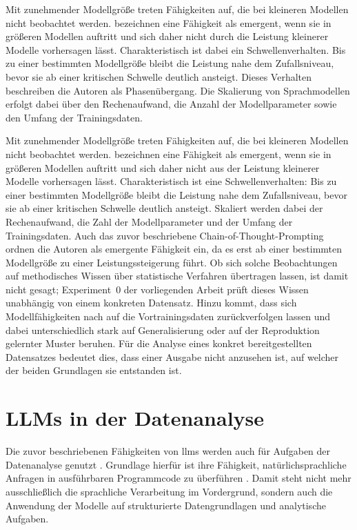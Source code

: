 Mit zunehmender Modellgröße treten Fähigkeiten auf, die bei kleineren Modellen nicht beobachtet werden. \textcite{wei_emergent_2022} bezeichnen eine Fähigkeit als emergent, wenn sie in größeren Modellen auftritt und sich daher nicht durch die Leistung kleinerer Modelle vorhersagen lässt. Charakteristisch ist dabei ein Schwellenverhalten. Bis zu einer bestimmten Modellgröße bleibt die Leistung nahe dem Zufallsniveau, bevor sie ab einer kritischen Schwelle deutlich ansteigt. Dieses Verhalten beschreiben die Autoren als Phasenübergang. Die Skalierung von Sprachmodellen erfolgt dabei über den Rechenaufwand, die Anzahl der Modellparameter sowie den Umfang der Trainingsdaten.

Mit zunehmender Modellgröße treten Fähigkeiten auf, die bei kleineren Modellen nicht beobachtet werden. \textcite{wei_emergent_2022} bezeichnen eine Fähigkeit als emergent, wenn sie in größeren Modellen auftritt und sich daher nicht aus der Leistung kleinerer Modelle vorhersagen lässt. Charakteristisch ist eine Schwellenverhalten: Bis zu einer bestimmten Modellgröße bleibt die Leistung nahe dem Zufallsniveau, bevor sie ab einer kritischen Schwelle deutlich ansteigt. Skaliert werden dabei der Rechenaufwand, die Zahl der Modellparameter und der Umfang der Trainingsdaten. Auch das zuvor beschriebene Chain-of-Thought-Prompting ordnen die Autoren als emergente Fähigkeit ein, da es erst ab einer bestimmten Modellgröße zu einer Leistungssteigerung führt. Ob sich solche Beobachtungen auf methodisches Wissen über statistische Verfahren übertragen lassen, ist damit nicht gesagt; Experiment~0 der vorliegenden Arbeit prüft dieses Wissen unabhängig von einem konkreten Datensatz. Hinzu kommt, dass sich Modellfähigkeiten nach \textcite{wang_generalization_2024} auf die Vortrainingsdaten zurückverfolgen lassen und dabei unterschiedlich stark auf Generalisierung oder auf der Reproduktion gelernter Muster beruhen. Für die Analyse eines konkret bereitgestellten Datensatzes bedeutet dies, dass einer Ausgabe nicht anzusehen ist, auf welcher der beiden Grundlagen sie entstanden ist.
 
\section{LLMs in der Datenanalyse}
\label{sec:llm-analyse}

Die zuvor beschriebenen Fähigkeiten von \glspl{llm} werden auch für Aufgaben der Datenanalyse genutzt \parencite{cheng_gpt_2023, li_tapilot-crossing_2024}. Grundlage hierfür ist ihre Fähigkeit, natürlichsprachliche Anfragen in ausführbaren Programmcode zu überführen \parencite{chen_evaluating_2021}. Damit steht nicht mehr ausschließlich die sprachliche Verarbeitung im Vordergrund, sondern auch die Anwendung der Modelle auf strukturierte Datengrundlagen und analytische Aufgaben.

